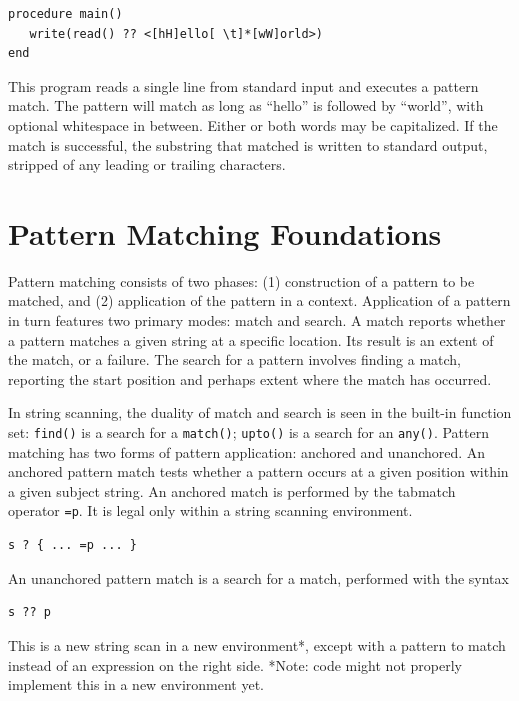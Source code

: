 \documentclass[letterpaper,12pt]{article}
\begin{document}
\begin{verbatim}
procedure main()
   write(read() ?? <[hH]ello[ \t]*[wW]orld>)
end
\end{verbatim}

This program reads a single line from standard input and executes a
pattern match. The pattern will match as long as ``hello'' is followed
by ``world'', with optional whitespace in between. Either or both
words may be capitalized. If the match is successful, the substring
that matched is written to standard output, stripped of any leading
or trailing characters.

\section{Pattern Matching Foundations}

Pattern matching consists of two phases: (1) construction of a
pattern to be matched, and (2) application of the pattern in a context.
Application of a pattern in turn features two primary modes: match
and search. A match reports whether a pattern matches a given string
at a specific location.  Its result is an extent of the match, or a
failure. The search for a pattern involves finding a match, reporting
the start position and perhaps extent where the match has occurred.

In string scanning, the duality of match and search is seen in the
built-in function set: {\tt find()} is a search for a {\tt match()};
{\tt upto()} is a search for an {\tt any()}. Pattern matching has
two forms of pattern
application: anchored and unanchored. An anchored pattern match tests
whether a pattern occurs at a given position within a given subject
string. An anchored match is performed by the tabmatch operator {\tt =p}.
It is legal only within a string scanning environment.

\begin{verbatim}
s ? { ... =p ... }
\end{verbatim}

An unanchored pattern match is a search for a match, performed with
the syntax

\begin{verbatim}
s ?? p
\end{verbatim}

\noindent This is a new string scan in a new environment*, except with
a pattern to match instead of an expression on the right side.  *Note:
code might not properly implement this in a new environment yet.
\end{document}
